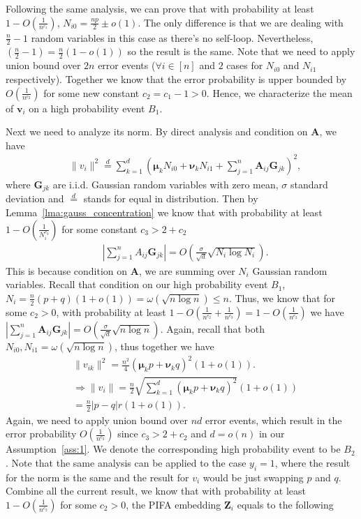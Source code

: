\documentclass{article} %
\begin{document}
Following the same analysis, we can prove that with probability at least $1-O(\frac{1}{n^{c_1}})$, $N_{i0}=\frac{np}{2}\pm o(1)$. The only difference is that we are dealing with $\frac{n}{2}-1$ random variables in this case as there's no self-loop. Nevertheless, $(\frac{n}{2}-1)= \frac{n}{2}(1-o(1))$ so the result is the same. Note that we need to apply union bound over $2n$ error events ($\forall i\in [n]$ and $2$ cases for $N_{i0}$ and $N_{i1}$ respectively). Together we know that the error probability is upper bounded by $O(\frac{1}{n^{c_2}})$ for some new constant $c_2=c_1-1>0$. Hence, we characterize the mean of $\mathbf{v}_i$ on a high probability event $B_1$.

Next we need to analyze its norm. By direct analysis and condition on $\mathbf{A}$, we have
\begin{align}
	& \|v_i\|^2 \stackrel{d}{=} \sum_{k=1}^d(\boldsymbol{\mu}_k N_{i0} + \boldsymbol{\nu}_k N_{i1} + \sum_{j=1}^{n}\mathbf{A}_{ij}\mathbf{G}_{jk})^2,
\end{align}
where $\mathbf{G}_{jk}$ are i.i.d. Gaussian random variables with zero mean, $\sigma$ standard deviation and $\stackrel{d}{=}$ stands for equal in distribution. Then by Lemma~\ref{lma:gauss_concentration} we know that with probability at least $1-O(\frac{1}{N_{i}^{c_3}})$ for some constant $c_3>2+c_2$
\begin{align}
	& |\sum_{j=1}^{n}A_{ij}\mathbf{G}_{jk}| = O(\frac{\sigma}{\sqrt{d}}\sqrt{N_{i}\log N_{i}}).
\end{align}
This is because condition on $\mathbf{A}$, we are summing over $N_i$ Gaussian random variables. Recall that condition on our high probability event $B_1$, $N_{i} = \frac{n}{2}(p+q)(1+o(1)) = \omega(\sqrt{n\log n}) \leq n$. Thus, we know that for some $c_2>0$, with probability at least $1-O(\frac{1}{n^{c_2}}+\frac{1}{n^{c_3}})=1-O(\frac{1}{n^{c_2}})$ we have $|\sum_{j=1}^{n}\mathbf{A}_{ij}\mathbf{G}_{jk}| = O(\frac{\sigma}{\sqrt{d}}\sqrt{n\log n})$.  Again, recall that both $N_{i0},N_{i1} = \omega(\sqrt{n\log n})$, thus together we have
\begin{align}
	& \|v_{ik}\|^2 = \frac{n^2}{4}(\boldsymbol{\mu}_kp+\boldsymbol{\nu}_kq)^2(1+o(1)).\\
	& \Rightarrow \|v_{i}\| = \frac{n}{2}\sqrt{\sum_{k=1}^d(\boldsymbol{\mu}_kp+\boldsymbol{\nu}_kq)^2}(1+o(1))\\
	& = \frac{n}{2}|p-q|r(1+o(1)).
\end{align}
Again, we need to apply union bound over $nd$ error events, which result in the error probability $O(\frac{1}{n^{c_2}})$ since $c_3>2+c_2$ and $d=o(n)$ in our Assumption~\ref{ass:1}. We denote the corresponding high probability event to be $B_2$. Note that the same analysis can be applied to the case $y_i=1$, where the result for the norm is the same and the result for $v_i$ would be just swapping $p$ and $q$. Combine all the current result, we know that with probability at least $1-O(\frac{1}{n^{c_2}})$ for some $c_2>0$, the PIFA embedding $\mathbf{Z}_i$ equals to the following
\end{document}
